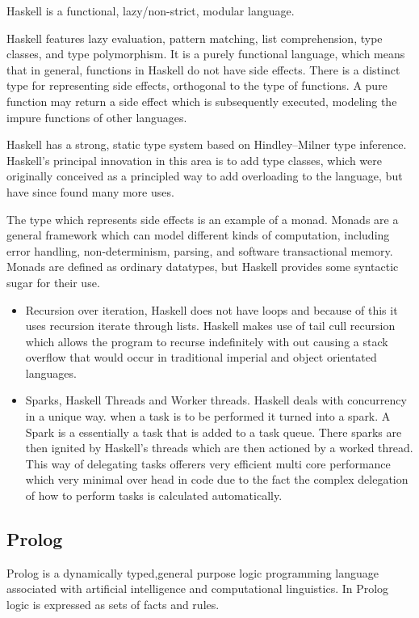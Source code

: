 \documentclass[a4paper,oneside]{report}
\begin{document}
	Haskell is a functional, lazy/non-strict, modular language.

	Haskell features lazy evaluation, pattern matching, list comprehension, type classes, and type polymorphism. It is a purely functional language, which means that in general, functions in Haskell do not have side effects. There is a distinct type for representing side effects, orthogonal to the type of functions. A pure function may return a side effect which is subsequently executed, modeling the impure functions of other languages.

	Haskell has a strong, static type system based on Hindley–Milner type inference. Haskell's principal innovation in this area is to add type classes, which were originally conceived as a principled way to add overloading to the language, but have since found many more uses.

	The type which represents side effects is an example of a monad. Monads are a general framework which can model different kinds of computation, including error handling, non-determinism, parsing, and software transactional memory. Monads are defined as ordinary datatypes, but Haskell provides some syntactic sugar for their use.
	

	\begin{itemize}
	\item Recursion over iteration, Haskell does not have loops and because of this it uses recursion iterate through lists. Haskell makes use of tail cull recursion which allows the program to recurse indefinitely with out causing a stack overflow that would occur in traditional imperial and object orientated languages.
	
	\item Sparks, Haskell Threads and Worker threads. Haskell deals with concurrency in a unique way. when a task is to be performed it turned into a spark. A Spark is a essentially a task that is added to a task queue.  There sparks are then ignited by Haskell's threads which are then actioned by a worked thread. This way of delegating tasks offerers very efficient multi core performance which very minimal over head in code due to the fact the complex delegation of how to perform tasks is calculated automatically.

	\end{itemize}
	


	\subsection{Prolog}
	Prolog is a dynamically typed,general purpose logic programming language associated with artificial intelligence and computational linguistics. In Prolog logic is expressed as sets of facts and rules.
	
\end{document}
